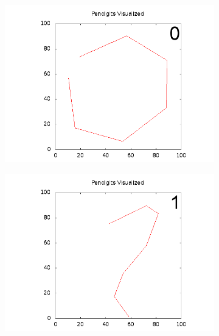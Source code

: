 \documentclass{article}
\begin{document}
\begin{figure}[h!]
  \begin{subfigure}
    \centering
    \includegraphics[scale=0.3,bb=0 0 640 480]{images/mean0.png}
    \label{picture-label}
  \end{subfigure}
  \begin{subfigure}
    \centering
    \includegraphics[scale=0.3,bb=0 0 640 480]{images/mean1.png}
    \label{picture-label}
  \end{subfigure}
  \begin{subfigure}
    \centering

\end{subfigure}
\end{figure}
\end{document}
